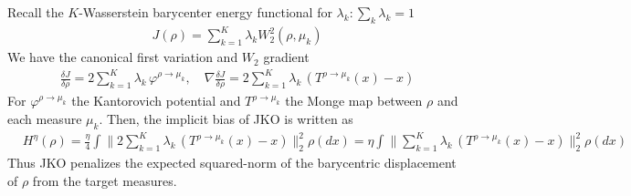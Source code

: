 \documentclass[reqno,11pt,letterpaper]{amsart}
\theoremstyle{plain}
\theoremstyle{definition}
\theoremstyle{remark}
\begin{document}
Recall the $K$-Wasserstein barycenter energy functional for $\lambda_{k}:\sum_{k}\lambda_{k} =1$
\begin{align*}
    J(\rho) = \sum_{k=1}^{K} \lambda_{k} W_{2}^{2}(\rho , \mu_{k})
\end{align*}
We have the canonical first variation and $W_2$ gradient \cite{AGS2008}
\begin{align*}
\frac{\delta J}{\delta \rho} = 2\sum_{k=1}^{K} \lambda_{k}\,\varphi^{\rho \to \mu_{k}}, \quad \nabla \frac{\delta J}{\delta \rho} = 2 \sum_{k=1}^{K} \lambda_{k} \,
(T^{\rho \to \mu_{k}}(x) - x)
\end{align*}
For $\varphi^{\rho \to \mu_{k}}$ the Kantorovich potential and $T^{\rho \to \mu_{k}}$ the Monge map between $\rho$ and each measure $\mu_{k}$. Then, the implicit bias of JKO is written as
\begin{align*}
&H^{\eta}(\rho) = \frac{\eta}{4} \int \Big\lVert  2 \sum_{k=1}^{K} \lambda_{k} \,
(T^{\rho \to \mu_{k}}(x) - x)\Big\rVert_{2}^{2} \rho(dx) =\eta \int \Big\lVert   \sum_{k=1}^{K} \lambda_{k} \,
(T^{\rho \to \mu_{k}}(x) - x) \Big\rVert_{2}^{2} \rho(dx)
\end{align*}
Thus JKO penalizes the expected squared-norm of the barycentric displacement of $\rho$ from the target measures.
\end{document}
